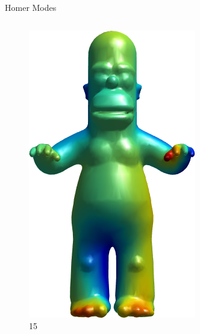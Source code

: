 \documentclass{beamer}
\begin{document}
\begin{frame}{Homer Modes}

\begin{columns}
\begin{column}[T]{3cm}
\begin{figure}[t]
    \includegraphics[width=\textwidth]{Harmonics/HomerModes/15.png}
    \caption*{\huge 15}
\end{figure}
\end{column}
\begin{column}[T]{3cm}
\begin{figure}[t]


\end{figure}
\end{column}
\end{columns}
\end{frame}
\end{document}
